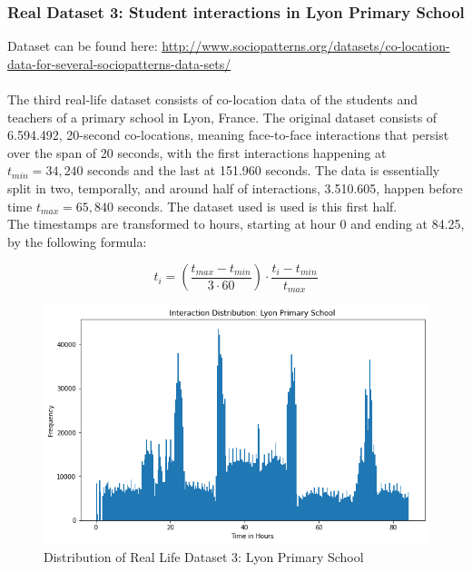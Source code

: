 \subsubsection{Real Dataset 3: Student interactions in Lyon Primary School}
\label{sec:Method:Reproducibility:RealDataset3}
Dataset can be found here: \href{http://www.sociopatterns.org/datasets/co-location-data-for-several-sociopatterns-data-sets/}{http://www.sociopatterns.org/datasets/co-location-data-for-several-sociopatterns-data-sets/}
\\\\
The third real-life dataset consists of co-location data of the students and teachers of a primary school in Lyon, France.
The original dataset consists of 6.594.492, 20-second co-locations, meaning face-to-face interactions that persist over the span of 20 seconds, with the first interactions happening at $t_{min} = 34,240$ seconds and the last at 151.960 seconds.
The data is essentially split in two, temporally, and around half of interactions, 3.510.605, happen before time $t_{max} = 65,840$ seconds.
The dataset used is used is this first half.
\\
The timestamps are transformed to hours, starting at hour 0 and ending at 84.25, by the following formula:

\begin{equation}
    t_i = \left(\frac{t_{max} - t_{min}}{3 \cdot 60} \right) \cdot \frac{t_i - t_{min}}{t_{max}}
\end{equation}

\begin{figure}[H]
    \centering
    \includegraphics[width=\textwidth]{0_images/real_dataset_3_dist.png}
    \caption{Distribution of Real Life Dataset 3: Lyon Primary School}
    \label{fig:RLdataset3}
\end{figure}



